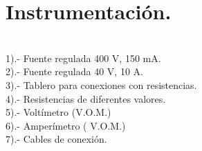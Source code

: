 \documentclass[11pt,a4paper]{article}
\begin{document}
\section{Instrumentaci\'{o}n.}\\
1).- Fuente regulada 400 V, 150 mA.\\
2).- Fuente regulada 40 V, 10 A.\\
3).- Tablero para conexiones con resistencias.\\
4).- Resistencias de diferentes valores.\\
5).- Volt\'{i}metro (V.O.M.)\\
6).- Amper\'{i}metro ( V.O.M.)\\
7).- Cables de conexi\'{o}n.\\
\pagebreak

\end{document}
